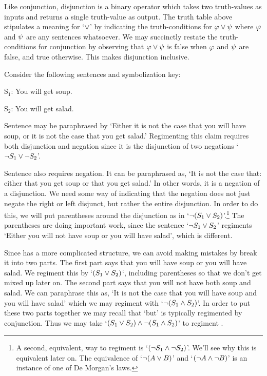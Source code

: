 Like conjunction, disjunction is a binary operator which takes two truth-values as inputs and returns a single truth-value as output.
The truth table above stipulates a meaning for `$\vee$' by indicating the truth-conditions for $\varphi \vee \psi$ where $\varphi$ and $\psi$ are any sentences whatsoever.
We may succinctly restate the truth-conditions for conjunction by observing that $\varphi\vee \psi$ is false when $\varphi$ and $\psi$ are false, and true otherwise.
This makes disjunction inclusive.

Consider the following sentences and symbolization key:

\begin{earg} \label{soup}
\end{earg}

\begin{ekey}
\item[S$_1$:] You will get soup.
\item[S$_2$:] You will get salad.
\end{ekey}

Sentence  may be paraphrased by `Either it is not the case that you will have soup, or it is not the case that you get salad.' 
Regimenting this claim requires both disjunction and negation since it is the disjunction of two negations `$\neg S_1 \vee \neg S_2$'.

Sentence  also requires negation.
It can be paraphrased as, `It is not the case that: either that you get soup or that you get salad.'
In other words, it is a negation of a disjunction.
We need some way of indicating that the negation does not just negate the right or left disjunct, but rather the entire disjunction.
In order to do this, we will put parentheses around the disjunction as in `$\neg (S_1 \vee S_2)$'.\footnote{A second, equivalent, way to regiment  is `$(\neg S_1 \wedge \neg S_2)$'. We'll see why this is equivalent later on. The equivalence of `$\neg (A \vee B)$' and `$(\neg A \wedge \neg B)$' is an instance of one of De Morgan's laws.}
The parentheses are doing important work, since the sentence `$\neg S_1 \vee S_2$' regiments `Either you will not have soup or you will have salad', which is different.

Since  has a more complicated structure, we can avoid making mistakes by break it into two parts.
The first part says that you will have soup or you will have salad.
We regiment this by `$(S_1 \vee S_2)$`, including parentheses so that we don't get mixed up later on.
The second part says that you will not have both soup and salad.
We can paraphrase this as, `It is not the case that you will have soup and you will have salad' which we may regiment with `$\neg(S_1 \wedge S_2)$'.
In order to put these two parts together we may recall that `but' is typically regimented by conjunction.
Thus we may take `$(S_1 \vee S_2) \wedge \neg(S_1 \wedge S_2)$' to regiment .





